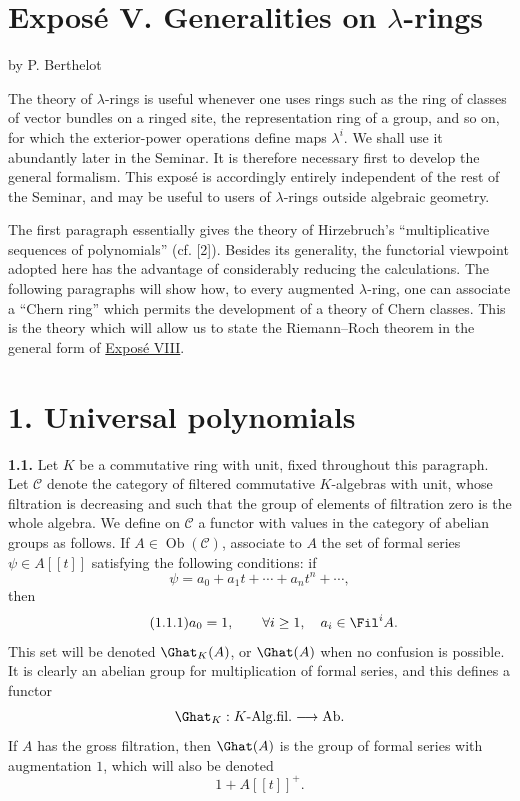 \section*{Exposé V. Generalities on \(\lambda\)-rings}
\begin{center}
by P. Berthelot
\end{center}

The theory of \(\lambda\)-rings is useful whenever one uses rings such as the ring of classes of vector bundles on a ringed site, the representation ring of a group, and so on, for which the exterior-power operations define maps \(\lambda^i\). We shall use it abundantly later in the Seminar. It is therefore necessary first to develop the general formalism. This exposé is accordingly entirely independent of the rest of the Seminar, and may be useful to users of \(\lambda\)-rings outside algebraic geometry.

The first paragraph essentially gives the theory of Hirzebruch's ``multiplicative sequences of polynomials'' (cf. [2]). Besides its generality, the functorial viewpoint adopted here has the advantage of considerably reducing the calculations. The following paragraphs will show how, to every augmented \(\lambda\)-ring, one can associate a ``Chern ring'' which permits the development of a theory of Chern classes. This is the theory which will allow us to state the Riemann--Roch theorem in the general form of \hyperlink{sga6.e08.expose}{Exposé VIII}.

\section*{1. Universal polynomials}

\textbf{1.1.} Let \(K\) be a commutative ring with unit, fixed throughout this paragraph. Let \(\mathcal C\) denote the category of filtered commutative \(K\)-algebras with unit, whose filtration is decreasing and such that the group of elements of filtration zero is the whole algebra. We define on \(\mathcal C\) a functor with values in the category of abelian groups as follows. If \(A\in\operatorname{Ob}(\mathcal C)\), associate to \(A\) the set of formal series \(\psi\in A[[t]]\) satisfying the following conditions: if
\[
  \psi=a_0+a_1t+\cdots+a_nt^n+\cdots ,
\]
then
\begin{equation}\tag{1.1.1}
  a_0=1,\qquad \forall i\geq 1,\quad a_i\in \Fil^i A .
\end{equation}
This set will be denoted \(\Ghat_K(A)\), or \(\Ghat(A)\) when no confusion is possible. It is clearly an abelian group for multiplication of formal series, and this defines a functor
\[
  \Ghat_K:K\text{-Alg.fil.}\longrightarrow \mathrm{Ab}.
\]
If \(A\) has the gross filtration, then \(\Ghat(A)\) is the group of formal series with augmentation \(1\), which will also be denoted
\[
  1+A[[t]]^+.
\]


